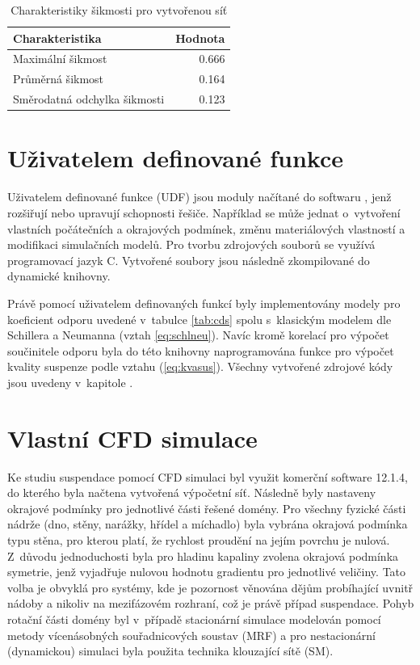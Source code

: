 \begin{table}[h!]
\centering
\caption{Charakteristiky šikmosti pro vytvořenou síť}
\label{tab:skw_tab}
\begin{tabular}{lr}
\toprule
\textbf{Charakteristika} & \textbf{Hodnota} \\
\midrule

Maximální šikmost & \num{0.666} \\
Průměrná šikmost & \num{0.164} \\
Směrodatná odchylka šikmosti & \num{0.123} \\

\bottomrule
\end{tabular}
\end{table}

\section{Uživatelem definované funkce}
Uživatelem definované funkce (UDF) jsou moduly načítané do softwaru \flu, jenž rozšiřují nebo upravují schopnosti řešiče. Například se může jednat o~vytvoření vlastních počátečních a okrajových podmínek, změnu materiálových vlastností a modifikaci simulačních modelů. Pro tvorbu zdrojových souborů se využívá programovací jazyk C. Vytvořené soubory jsou následně zkompilované do dynamické knihovny.

Právě pomocí uživatelem definovaných funkcí byly implementovány modely pro koeficient odporu uvedené v~tabulce \ref{tab:cds} spolu s~klasickým modelem dle Schillera a Neumanna (vztah \ref{eq:schlneu}). Navíc kromě korelací pro výpočet součinitele odporu byla do této knihovny naprogramována funkce pro výpočet kvality suspenze podle vztahu (\ref{eq:kvasus}). Všechny vytvořené zdrojové kódy jsou uvedeny v~kapitole .

\section{Vlastní CFD simulace}
Ke studiu suspendace pomocí CFD simulaci byl využit komerční software \flu{} 12.1.4, do kterého byla načtena vytvořená výpočetní síť. Následně byly nastaveny okrajové podmínky pro jednotlivé části řešené domény. Pro všechny fyzické části nádrže (dno, stěny, narážky, hřídel a míchadlo) byla vybrána okrajová podmínka typu stěna, pro kterou platí, že rychlost proudění na jejím povrchu je nulová. Z~důvodu jednoduchosti byla pro hladinu kapaliny zvolena okrajová podmínka symetrie, jenž vyjadřuje nulovou hodnotu gradientu pro jednotlivé veličiny. Tato volba je obvyklá pro systémy, kde je pozornost věnována dějům probíhající uvnitř nádoby a nikoliv na mezifázovém rozhraní, což je právě případ suspendace. Pohyb rotační části domény byl v~případě stacionární simulace modelován pomocí metody vícenásobných souřadnicových soustav (MRF) a pro nestacionární (dynamickou) simulaci byla použita technika klouzající sítě (SM). 


